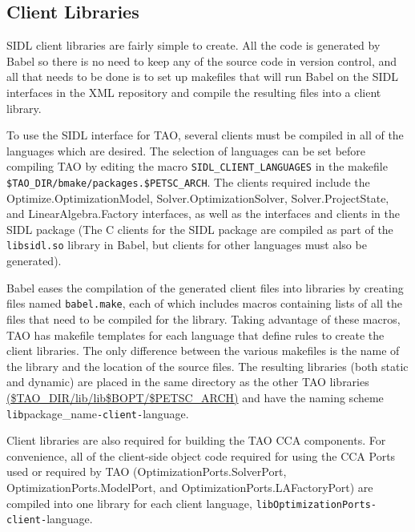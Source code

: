 \documentclass[doublespacing,12pt]{article}
\begin{document}
\subsection{Client Libraries}\label{sec:clientlibs}
SIDL client libraries are fairly simple to create.  All the code is generated 
by Babel so there is no need to keep any of the source code in version control,
and all that needs to be done is to set up makefiles that will run Babel on 
the SIDL interfaces in the XML repository and compile the resulting files 
into a client library.

To use the SIDL interface for TAO, several clients must be compiled in all
of the languages which are desired.  The selection of languages can be set
before compiling TAO by editing the macro \texttt{SIDL\_CLIENT\_LANGUAGES} in the
makefile \texttt{\$TAO\_DIR/bmake/packages.\$PETSC\_ARCH}.  The clients 
required include the \textsf{Optimize.Op\-ti\-mi\-za\-tion\-Mod\-el}, 
\textsf{Sol\-ver.Op\-ti\-mi\-za\-tion\-Sol\-ver}, \textsf{Solver.Pro\-ject\-State}, 
and \textsf{Lin\-ear\-Al\-ge\-bra.Fact\-ory}
interfaces, as
well as the interfaces and clients in the SIDL package
(The C clients for the SIDL package are compiled as part of the 
\texttt{libsidl.so} library in Babel, but clients for other languages must
also be generated).

Babel eases the compilation of the generated client files into libraries
by creating files named \texttt{babel.make}, each of which includes macros
containing lists of all the files that need to be compiled for the library.
Taking advantage of these macros, TAO has makefile templates for each language
that define rules to create the client libraries.  The only difference between
the various makefiles is the name of the library and the location of the source
files.  The resulting libraries (both static and dynamic) are placed in the 
same directory as the other
TAO libraries \url{($TAO_DIR/lib/lib$BOPT/$PETSC_ARCH)} %
and have the naming 
scheme \texttt{lib}package\_name\texttt{-client-}language.

Client libraries are also required for building the TAO CCA components.  For 
convenience, all of the client-side object code required for 
using the CCA Ports
used or required by TAO (\textsf{Optimization\-Ports.SolverPort}, 
\textsf{Optimization\-Ports.Model\-Port}, and 
\textsf{Optimization\-Ports.LAFact\-ory\-Port}) are compiled
into one library for each client language, 
\texttt{libOp\-ti\-mi\-za\-tion\-Ports-client-}language.
\end{document}
